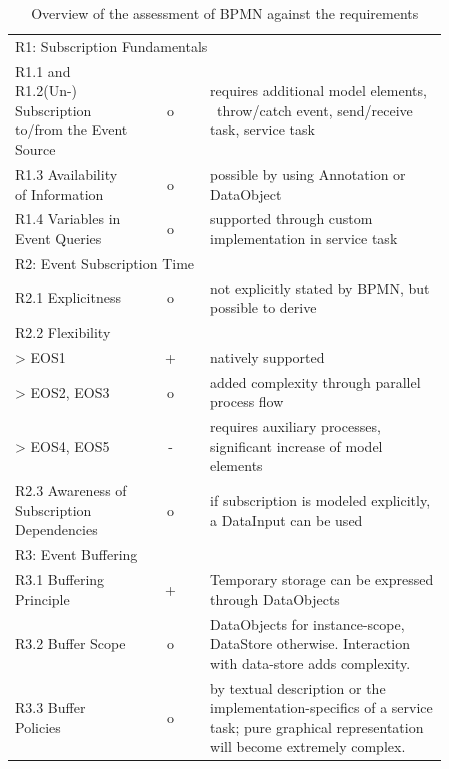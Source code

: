 \begin{table}%
	\myfloatalign
	\begin{tabularx}{\textwidth}{p{0.3\linewidth} | c | p{0.555\linewidth}}
		\toprule
		\tableheadline{Requirement} & \tableheadline{Ev.} & \tableheadline{Explanation} \\ 
		\midrule
		
		\multicolumn{3}{p{\linewidth}}{\rule{0pt}{4ex} R1: Subscription Fundamentals} \\
		\midrule
		
		R1.1 and R1.2\newline(Un-)\,Subscription to/from the Event Source & o & requires additional model elements, \eg~throw/catch event, send/receive task, service task \\
		R1.3 Availability of Information & o & possible by using Annotation or DataObject  \\
		R1.4 Variables in Event Queries & o & supported through custom implementation in service task \\
		
		\midrule
		\multicolumn{3}{p{\linewidth}}{\rule{0pt}{4ex} R2: Event Subscription Time} \\
		\midrule
		
		R2.1 Explicitness & o & not explicitly stated by BPMN, but possible to derive \\
		R2.2 Flexibility & & \\
		> EOS1 & + & natively supported \\
		> EOS2, EOS3 & o & added complexity through parallel process flow \\
		> EOS4, EOS5 & - & requires auxiliary processes, significant increase of model elements \\
		R2.3 Awareness of Subscription Dependencies & o & if subscription is modeled explicitly, a DataInput can be used \\
		
		\midrule
		\multicolumn{3}{p{\linewidth}}{\rule{0pt}{4ex} R3: Event Buffering} \\
		\midrule
		
		R3.1 Buffering Principle & + & Temporary storage can be expressed through DataObjects \\
		R3.2 Buffer Scope & o & DataObjects for instance-scope, DataStore otherwise. Interaction with data-store adds complexity. \\
		R3.3 Buffer Policies & o & by textual description or the implementation-specifics of a service task; pure graphical representation will become extremely complex. \\
		
	\end{tabularx}
	\caption[]{Overview of the assessment of BPMN against the requirements}
	\label{tab:assessment-bpmn}
\end{table}

